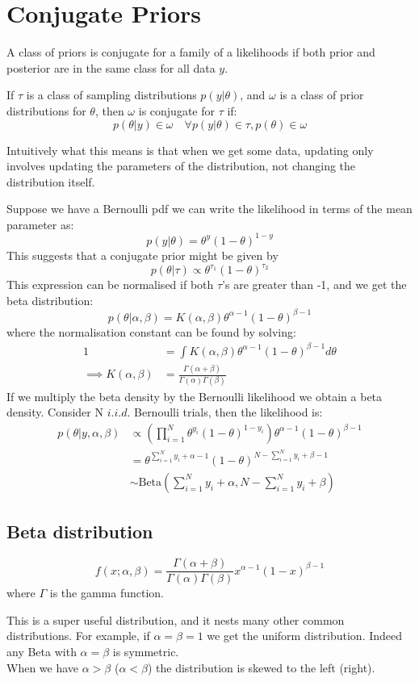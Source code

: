 \documentclass[DIV=14,titlepage=false]{scrreprt}
\begin{document}
\section{Conjugate Priors}
A class of priors is conjugate for a family of a likelihoods if both prior and posterior are in the same class for all data $y$.
\begin{definition}
    If $\tau$ is a class of sampling distributions $p(y|\theta)$, and $\omega$ is a class of prior distributions for $\theta$, then $\omega$ is conjugate for $\tau$ if:
    \[
        p(\theta|y) \in \omega \quad \forall p(y|\theta) \in \tau, p(\theta) \in \omega
    \]
\end{definition}
Intuitively what this means is that when we get some data, updating only involves updating the parameters of the distribution, not changing the distribution itself.
\begin{example}
    Suppose we have a Bernoulli pdf  we can write the likelihood in terms of the mean parameter as:
    \[
        p(y|\theta) = \theta^y(1-\theta)^{1-y}
    \]
    This suggests that a conjugate prior might be given by \[
       p(\theta|\tau) \propto \theta^{\tau_1}(1-\theta)^{\tau_2}
    \]
    This expression can be normalised if both $\tau$'s are greater than -1, and we get the beta distribution:
    \[
        p(\theta|\alpha,\beta) = K(\alpha,\beta)\theta^{\alpha-1}(1-\theta)^{\beta-1}
    \]
    where the normalisation constant can be found by solving:
    \begin{align*}
        1 &= \int K(\alpha,\beta)\theta^{\alpha-1}(1-\theta)^{\beta-1}d\theta\\
        \implies K(\alpha,\beta) &= \frac{\Gamma(\alpha+\beta)}{\Gamma(\alpha)\Gamma(\beta)}
    \end{align*}
    If we multiply the beta density by the Bernoulli likelihood we obtain a beta density. Consider N $i.i.d.$ Bernoulli trials, then the likelihood is:
    \begin{align*}
        p(\theta | y, \alpha, \beta) &\propto \left( \prod_{i=1}^N \theta^{y_i}(1-\theta)^{1-y_i}\right)\theta^{\alpha-1}(1-\theta)^{\beta-1}\\
        &= \theta^{\sum_{i=1}^N y_i + \alpha - 1}(1-\theta)^{N-\sum_{i=1}^N y_i + \beta - 1}\\
        & \sim \text{Beta}(\sum_{i=1}^N y_i + \alpha, N-\sum_{i=1}^N y_i + \beta)
\end{align*}
\end{example}
\subsection{Beta distribution}
\begin{definition}
    \[
    f(x; \alpha, \beta) = \frac{\Gamma(\alpha+\beta)}{\Gamma(\alpha)\Gamma(\beta)}x^{\alpha-1}(1-x)^{\beta-1}
\]
where $\Gamma$ is the gamma function.
\end{definition}
This is a super useful distribution, and it nests many other common distributions. For example, if $\alpha=\beta=1$ we get the uniform distribution. Indeed any Beta with $\alpha=\beta$ is symmetric.\\
When we have $\alpha>\beta$ ($\alpha<\beta$) the distribution is skewed to the left (right).
\end{document}
